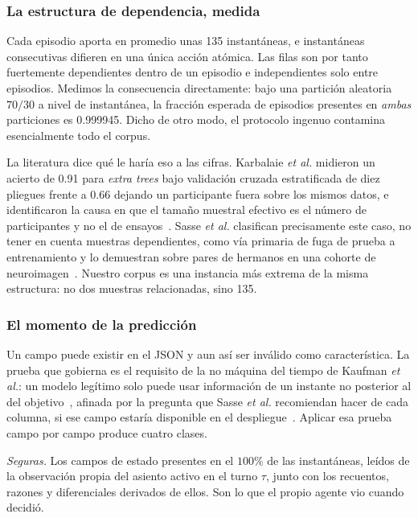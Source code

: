 \documentclass[conference]{IEEEtran}
\begin{document}
\subsubsection{La estructura de dependencia, medida}
Cada episodio aporta en promedio unas 135 instant\'aneas, e instant\'aneas
consecutivas difieren en una \'unica acci\'on at\'omica. Las filas son por
tanto fuertemente dependientes dentro de un episodio e independientes solo
entre episodios. Medimos la consecuencia directamente: bajo una partici\'on
aleatoria $70/30$ a nivel de instant\'anea, la fracci\'on esperada de
episodios presentes en \emph{ambas} particiones es 0.999945. Dicho de otro
modo, el protocolo ingenuo contamina esencialmente todo el corpus.

La literatura dice qu\'e le har\'ia eso a las cifras. Karbalaie
\textit{et al.} midieron un acierto de 0.91 para \emph{extra trees} bajo
validaci\'on cruzada estratificada de diez pliegues frente a 0.66 dejando un
participante fuera sobre los mismos datos, e identificaron la causa en que el
tama\~no muestral efectivo es el n\'umero de participantes y no el de
ensayos~\cite{karbalaie_participantaware_2026}. Sasse \textit{et al.}
clasifican precisamente este caso, no tener en cuenta muestras
dependientes, como v\'ia primaria de fuga de prueba a entrenamiento y lo
demuestran sobre pares de hermanos en una cohorte de
neuroimagen~\cite{sasse_leakage_2025}. Nuestro corpus es una instancia
m\'as extrema de la misma estructura: no dos muestras relacionadas, sino
135.

\subsubsection{El momento de la predicci\'on}
Un campo puede existir en el JSON y aun as\'i ser inv\'alido como
caracter\'istica. La prueba que gobierna es el requisito de la no m\'aquina
del tiempo de Kaufman \textit{et al.}: un modelo leg\'itimo solo puede usar
informaci\'on de un instante no posterior al del
objetivo~\cite{kaufman_leakage_2011}, afinada por la pregunta que Sasse
\textit{et al.} recomiendan hacer de cada columna, si ese campo
estar\'ia disponible en el despliegue~\cite{sasse_leakage_2025}. Aplicar esa
prueba campo por campo produce cuatro clases.

\emph{Seguras.} Los campos de estado presentes en el $100\%$ de las
instant\'aneas, le\'idos de la observaci\'on propia del asiento activo en el
turno $\tau$, junto con los recuentos, razones y diferenciales derivados de
ellos. Son lo que el propio agente vio cuando decidi\'o.
\end{document}

